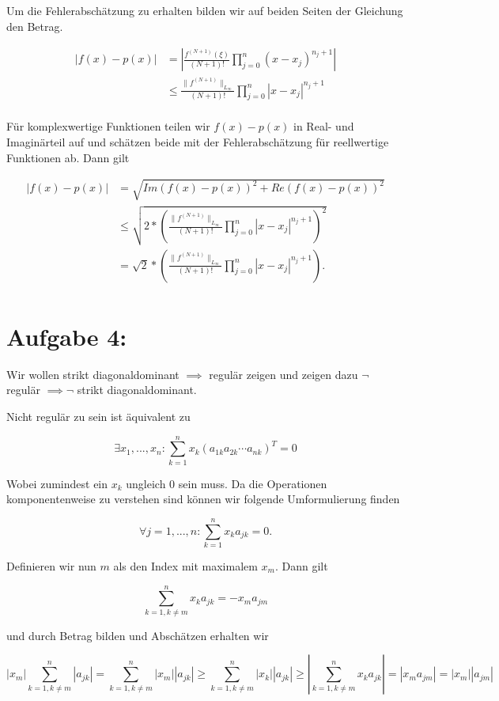 \documentclass[]{article}
\begin{document}
Um die Fehlerabschätzung zu erhalten bilden wir auf beiden Seiten der Gleichung den Betrag.

\begin{align*}
	|f(x)-p(x)| &= \left| \frac{f^{(N+1)}(\xi)}{(N+1)!} \prod_{j=0}^{n}(x-x_j)^{n_j+1}\right| \\
	& \leq \frac{\|f^{(N+1)}\|_{L_\infty}}{(N+1)!} \prod_{j=0}^{n}|x-x_j|^{n_j+1} \\
\end{align*}

Für komplexwertige Funktionen teilen wir $f(x)-p(x)$ in Real- und Imaginärteil auf und schätzen beide mit der Fehlerabschätzung für reellwertige Funktionen ab. Dann gilt

\begin{align*}
	|f(x)-p(x)| &= \sqrt{Im(f(x)-p(x))^2 + Re(f(x)-p(x))^2} \\
	 & \leq \sqrt{2*\left(\frac{\|f^{(N+1)}\|_{L_\infty}}{(N+1)!} \prod_{j=0}^{n}|x-x_j|^{n_j+1}\right)^2} \\
	 &= \sqrt{2} * \left(\frac{\|f^{(N+1)}\|_{L_\infty}}{(N+1)!} \prod_{j=0}^{n}|x-x_j|^{n_j+1}\right). \\
\end{align*}

\section{Aufgabe 4:}
Wir wollen strikt diagonaldominant $\implies$ regulär zeigen und zeigen dazu $\neg$ regulär $\implies \neg$ strikt diagonaldominant.

Nicht regulär zu sein ist äquivalent zu

\[\exists x_1, ..., x_n: \sum_{k=1}^{n}x_k (a_{1k} a_{2k} \cdots a_{nk})^T = 0\]

Wobei zumindest ein $x_k$ ungleich $0$ sein muss. Da die Operationen komponentenweise zu verstehen sind können wir folgende Umformulierung finden

\[\forall j=1, ..., n : \sum_{k=1}^{n}x_ka_{jk} = 0.\]

Definieren wir nun $m$ als den Index mit maximalem $x_m$. Dann gilt

\[\sum_{k=1, k\neq m}^{n}x_ka_{jk} = -x_ma_{jm}\]

und durch Betrag bilden und Abschätzen erhalten wir

\[|x_m| \sum_{k=1, k\neq m}^{n}|a_{jk}| = \sum_{k=1, k\neq m}^{n}|x_m| |a_{jk}| \geq \sum_{k=1, k\neq m}^{n}|x_k| |a_{jk}| \geq \left| \sum_{k=1, k\neq m}^{n}x_ka_{jk} \right| = |x_ma_{jm}| = |x_m| |a_{jm}|\]
\end{document}
